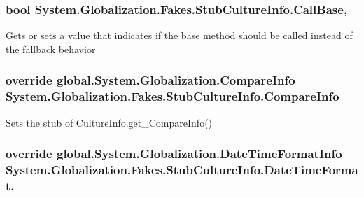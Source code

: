 \hypertarget{class_system_1_1_globalization_1_1_fakes_1_1_stub_culture_info_ae4fc4a7693b78d0e2b2000e5c6989c91}{
\subsubsection[{Call\-Base}]{\setlength{\rightskip}{0pt plus 5cm}bool System.\-Globalization.\-Fakes.\-Stub\-Culture\-Info.\-Call\-Base\hspace{0.3cm}{\ttfamily [get]}, {\ttfamily [set]}}}\label{class_system_1_1_globalization_1_1_fakes_1_1_stub_culture_info_ae4fc4a7693b78d0e2b2000e5c6989c91}


Gets or sets a value that indicates if the base method should be called instead of the fallback behavior

\hypertarget{class_system_1_1_globalization_1_1_fakes_1_1_stub_culture_info_a9cc4efe88f71da3a3969a79846d5ba35}{
\subsubsection[{Compare\-Info}]{\setlength{\rightskip}{0pt plus 5cm}override global.\-System.\-Globalization.\-Compare\-Info System.\-Globalization.\-Fakes.\-Stub\-Culture\-Info.\-Compare\-Info\hspace{0.3cm}{\ttfamily [get]}}}\label{class_system_1_1_globalization_1_1_fakes_1_1_stub_culture_info_a9cc4efe88f71da3a3969a79846d5ba35}


Sets the stub of Culture\-Info.\-get\-\_\-\-Compare\-Info()

\hypertarget{class_system_1_1_globalization_1_1_fakes_1_1_stub_culture_info_ae12bc82e4a539805cf30e4630469635c}{
\subsubsection[{Date\-Time\-Format}]{\setlength{\rightskip}{0pt plus 5cm}override global.\-System.\-Globalization.\-Date\-Time\-Format\-Info System.\-Globalization.\-Fakes.\-Stub\-Culture\-Info.\-Date\-Time\-Format\hspace{0.3cm}{\ttfamily [get]}, {\ttfamily [set]}}}\label{class_system_1_1_globalization_1_1_fakes_1_1_stub_culture_info_ae12bc82e4a539805cf30e4630469635c}


